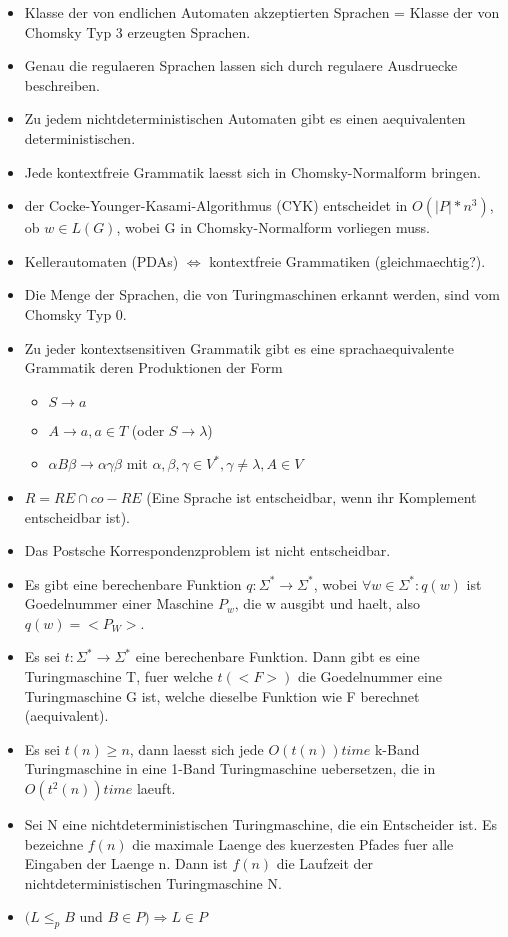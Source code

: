 \documentclass[a4paper]{scrreprt}
\begin{document}
\begin{itemize}
	\item Klasse der von endlichen Automaten akzeptierten Sprachen = Klasse der von Chomsky Typ 3 erzeugten Sprachen.
	\item Genau die regulaeren Sprachen lassen sich durch regulaere Ausdruecke beschreiben.
	\item Zu jedem nichtdeterministischen Automaten gibt es einen aequivalenten deterministischen.
	\item Jede kontextfreie Grammatik laesst sich in Chomsky-Normalform bringen.
	\item der Cocke-Younger-Kasami-Algorithmus (CYK) entscheidet in $O(|P|*n^3)$, ob $w \in L(G)$, wobei G in Chomsky-Normalform vorliegen muss.
	\item Kellerautomaten (PDAs) $\Leftrightarrow$ kontextfreie Grammatiken (gleichmaechtig?).
	\item Die Menge der Sprachen, die von Turingmaschinen erkannt werden, sind vom Chomsky Typ 0.
	\item Zu jeder kontextsensitiven Grammatik gibt es eine sprachaequivalente Grammatik deren Produktionen der Form
		\begin{itemize}
			\item $S \rightarrow a$
			\item $A \rightarrow a, a \in T$ (oder $S \rightarrow \lambda$)
			\item $\alpha B \beta \rightarrow \alpha\gamma\beta$ mit $\alpha,\beta,\gamma \in V^*,\gamma \neq \lambda, A \in V$
		\end{itemize}
	\item $R = RE \cap co-RE$ (Eine Sprache ist entscheidbar, wenn ihr Komplement entscheidbar ist).
	\item Das Postsche Korrespondenzproblem ist nicht entscheidbar.
	\item Es gibt eine berechenbare Funktion $q: \Sigma^* \rightarrow \Sigma^*$, wobei $\forall w \in \Sigma^*: q(w)$ ist Goedelnummer einer Maschine $P_w$, die w ausgibt und haelt, also $q(w) = <P_W>$.
	\item Es sei $t: \Sigma^* \rightarrow \Sigma^*$ eine berechenbare Funktion. Dann gibt es eine Turingmaschine T, fuer welche $t(<F>)$ die Goedelnummer eine Turingmaschine G ist, welche dieselbe Funktion wie F berechnet (aequivalent).
	\item Es sei $t(n) \ge n$, dann laesst sich jede $O(t(n)) time$ k-Band Turingmaschine in eine 1-Band Turingmaschine uebersetzen, die in $O(t^2(n)) time$ laeuft.
	\item Sei N eine nichtdeterministischen Turingmaschine, die ein Entscheider ist. Es bezeichne $f(n)$ die maximale Laenge des kuerzesten Pfades fuer alle Eingaben der Laenge n. Dann ist $f(n)$ die Laufzeit der nichtdeterministischen Turingmaschine N.
	\item $(L \le_p B$ und $B \in P) \Rightarrow L \in P$
\end{itemize}
\end{document}
